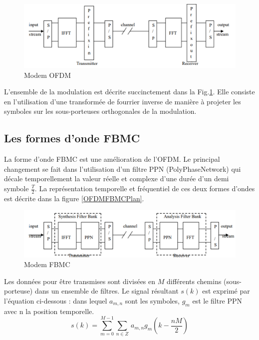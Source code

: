 \documentclass[conference]{IEEEtran}
\begin{document}
\begin{figure}[htbp]
\centerline{\includegraphics{modemOFDM.png}}
\caption{Modem OFDM}
\label{modemOFDM}
\end{figure}

L'ensemble de la modulation est décrite succinctement dans la Fig.\ref{modemOFDM}. Elle consiste en l'utilisation d'une transformée de fourrier inverse de manière à projeter les symboles sur les sous-porteuses orthogonales de la modulation.


\subsection{Les formes d'onde FBMC}

La forme d'onde FBMC est une amélioration de l'OFDM. Le principal changement se fait dans l'utilisation d'un filtre PPN (PolyPhaseNetwork) qui décale temporellement la valeur réelle et complexe d'une durée d'un demi symbole $\frac{T}{2}$. 
La représentation temporelle et fréquentiel de ces deux formes d'ondes est décrite dans la figure \ref{OFDMFBMCPlan}.

\begin{figure}[htbp]
\centerline{\includegraphics{modemFBMC.png}}
\caption{Modem FBMC}
\label{modemFBMC}
\end{figure}

Les données pour être transmises sont divisées en $M$ différents chemins (sous-porteuse) dans un ensemble de filtres. Le signal résultant $s(k)$ est exprimé par l’équation ci-dessous : 
dans lequel $a_{m,n}$ sont les symboles, $g_{m}$ est le filtre PPN avec n la position temporelle\cite{b4}.
\begin{equation}
s(k) = \sum^{M-1}_{m=0}\sum_{n \in Z}\,a_{m,n}g_{m}(k-\frac{nM}{2})\label{FBMC_equat}
\end{equation}
\end{document}
